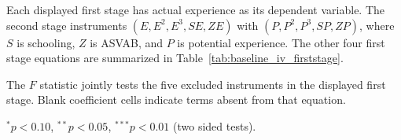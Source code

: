 \documentclass[11pt]{article}
\begin{document}
\begin{table}[p]
\begin{threeparttable}
\begin{tablenotes}[flushleft]
\item Each displayed first stage has actual experience as its dependent variable. The second stage instruments $(E,E^2,E^3,SE,ZE)$ with $(P,P^2,P^3,SP,ZP)$, where $S$ is schooling, $Z$ is ASVAB, and $P$ is potential experience. The other four first stage equations are summarized in Table~\ref{tab:baseline_iv_firststage}.
\item The $F$ statistic jointly tests the five excluded instruments in the displayed first stage. Blank coefficient cells indicate terms absent from that equation.
\item $^{*}p<0.10$, $^{**}p<0.05$, $^{***}p<0.01$ (two sided tests).
\end{tablenotes}
\end{threeparttable}
\end{table}
\end{document}
